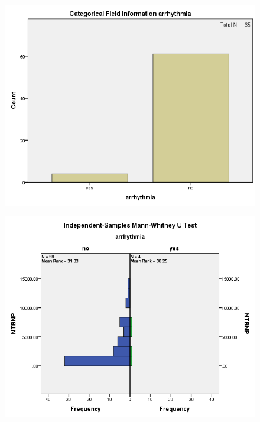\documentclass[14pt,a4paper,onecolumn]{extarticle}
\begin{document}
\clearpage
\begin{figure}
    \centering
    \includegraphics[scale=0.7]{./images/cat_arrhythmia.png}
    \caption{}
    \label{}
\end{figure}

\clearpage
\begin{figure}
    \centering
    \includegraphics[scale=0.7]{./images/manwhit_arrhythmia.png}
    \caption{}
    \label{}
\end{figure}
\end{document}
